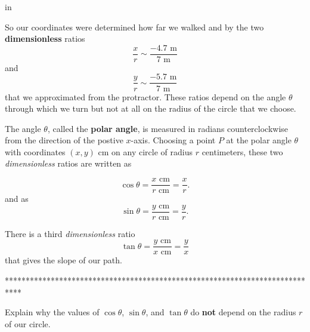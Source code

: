\documentclass{ximera}
\newcommand{\pskip}{\vskip 0.1 in}
\begin{document}
\begin{question}
\pskip

So our coordinates were determined how far we walked and by the two {\bf dimensionless} ratios
\[
    \frac{x}{r} \sim \frac{-4.7\text{ m}}{7\text{ m}}
\] 
and
\[
   \frac{y}{r} \sim \frac{-5.7\text{ m}}{7\text{ m}}
\]
that we approximated from the protractor. These ratios depend on the angle $\theta$ through which we turn but not at all on the radius of the circle that we choose. 

The angle $\theta$, called the {\bf polar angle}, is measured in radians counterclockwise from the direction of the postive $x$-axis. Choosing a point $P$ at the polar angle $\theta$ with coordinates $(x,y)$ cm on any circle of radius $r$ centimeters, these two \emph{dimensionless} ratios are written as

\[
   \cos \theta = \frac{x \text{ cm}}{r \text{ cm}} = \frac{x}{r} .
\]
and as
\[
   \sin \theta = \frac{y \text{ cm}}{r \text{ cm}} = \frac{y}{r} .
\]

There is a third \emph{dimensionless} ratio 
\[
  \tan \theta = \frac{y \text{ cm}}{x \text{ cm}} = \frac{y}{x}
\]
that gives the slope of our path. 


\end{question}

****************************************************************************

\fi



\begin{question} \label{Q1:Cosine}
Explain why the values of $\cos \theta$, $\sin\theta$, and $\tan\theta$ do {\bf not} depend on the radius $r$ of our circle. 
\end{question}
\end{document}
